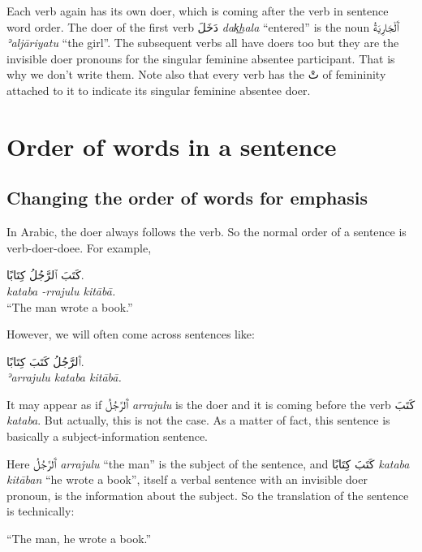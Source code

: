 \documentclass[
  10pt,
]{book}
\begin{document}
Each verb again has its own doer, which is coming after the verb in sentence word order. The doer of the first verb \foreignlanguage{arabic}{دَخَلَ} \emph{dak͟hala} \enquote{entered} is the noun
\foreignlanguage{arabic}{ٱَلْجَارِيَةُ} \emph{ʾaljāriyatu} \enquote{the girl}.
The subsequent verbs all have doers too but they are the invisible doer pronouns for the singular feminine absentee participant. That is why we don't write them. Note also that every verb has the \foreignlanguage{arabic}{تْ} of femininity attached to it to indicate its singular feminine absentee doer.

\section{Order of words in a sentence}\label{order-of-words-in-a-sentence}

\subsection{Changing the order of words for emphasis}\label{changing-the-order-of-words-for-emphasis}

In Arabic, the doer always follows the verb. So the normal order of a sentence is verb-doer-doee. For example,

\foreignlanguage{arabic}{کَتَبَ ٱلرَّجُلُ کِتَابًا.}\\
\emph{kataba -rrajulu kitābā.}\\
\enquote{The man wrote a book.}

However, we will often come across sentences like:

\foreignlanguage{arabic}{ٱَلرَّجُلُ کَتَبَ کِتَابًا.}\\
\emph{ʾarrajulu kataba kitābā.}

It may appear as if \foreignlanguage{arabic}{ٱَلرَّجُلُ} \emph{arrajulu} is the doer and it is coming before the verb \foreignlanguage{arabic}{کَتَبَ} \emph{kataba}. But actually, this is not the case. As a matter of fact, this sentence is basically a subject-information sentence.

Here \foreignlanguage{arabic}{ٱَلرَّجُلُ} \emph{arrajulu} \enquote{the man} is the subject of the sentence, and \foreignlanguage{arabic}{کَتَبَ کِتَابًا} \emph{kataba kitāban} \enquote{he wrote a book}, itself a verbal sentence with an invisible doer pronoun, is the information about the subject. So the translation of the sentence is technically:

\enquote{The man, he wrote a book.}
\end{document}
